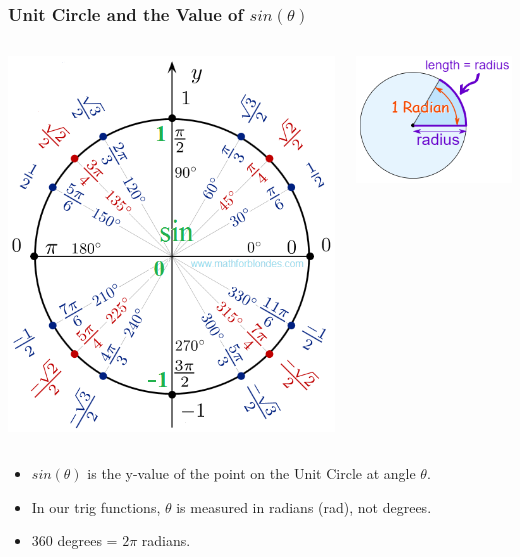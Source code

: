 \documentclass{beamer}
\begin{document}
\begin{frame}\frametitle{Unit Circle and the Value of $sin(\theta)$}
\begin{columns}
\begin{column}{6cm}
\begin{center}
\includegraphics[scale=0.25]{fig/unitcircle_sin.png}
\end{center}
\end{column}
\begin{column}{6cm}
\begin{center}
\includegraphics[scale=0.75]{fig/unitcircle_rad.png}
\end{center}
\end{column}
\end{columns}

\vspace{0.25cm}

\begin{itemize}
\item $sin(\theta)$ is the y-value of the point on the Unit Circle at angle $\theta$. 
\item In our trig functions, $\theta$ is measured in radians (rad), not degrees.
\item 360 degrees = $2 \pi$ radians.
\end{itemize}
\end{frame}
\end{document}
